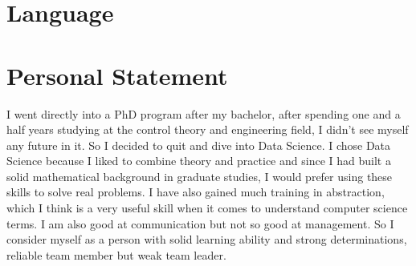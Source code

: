 \documentclass[11pt,a4paper,sans]{moderncv} %
\begin{document}

\section{Language}




\section{Personal Statement}
I went directly into a PhD program after my bachelor, after spending one and a half years studying at the control theory and engineering field, I didn't see myself any future in it. So I decided to quit and dive into Data Science. I chose Data Science because I liked to combine theory and practice and since I had built a solid mathematical background in graduate studies, I would prefer using these skills to solve real problems. I have also gained much training in abstraction, which I think is a very useful skill when it comes to understand computer science terms. I am also good at communication but not so good at management. So I consider myself as a person with solid learning ability and strong determinations, reliable team member but weak team leader.  






\end{document}
